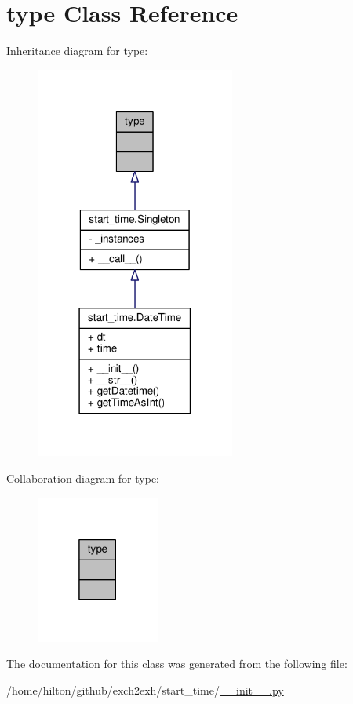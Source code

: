 \hypertarget{classtype}{}\section{type Class Reference}
\label{classtype}


Inheritance diagram for type\+:
\nopagebreak
\begin{figure}[H]
\begin{center}
\leavevmode
\includegraphics[width=186pt]{classtype__inherit__graph}
\end{center}
\end{figure}


Collaboration diagram for type\+:
\nopagebreak
\begin{figure}[H]
\begin{center}
\leavevmode
\includegraphics[width=115pt]{classtype__coll__graph}
\end{center}
\end{figure}


The documentation for this class was generated from the following file\+:\begin{DoxyCompactItemize}
\item 
/home/hilton/github/exch2exh/start\+\_\+time/\hyperlink{start__time_2____init_____8py}{\+\_\+\+\_\+init\+\_\+\+\_\+.\+py}\end{DoxyCompactItemize}

